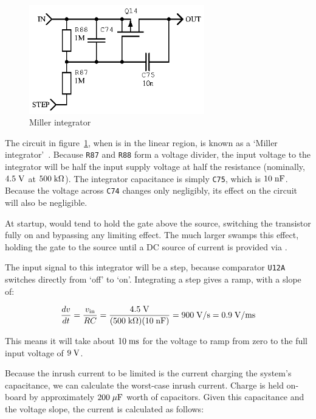 \begin{figure}[H]
\centering
\includegraphics[width=3in]{millerint}
\caption{Miller integrator}
\label{fig:miller}
\end{figure}

The circuit in figure~\ref{fig:miller}, when  is in the linear
region, is known as a `Miller integrator'~\cite[pg. 283]{tranckts-sawtooth}.
Because \texttt{R87} and \texttt{R88} form a voltage divider, the input
voltage to the integrator will be half the input supply voltage at half
the resistance (nominally, $4.5\;\mathrm{V}$ at $500\;\mathrm{k\Omega}$). The
integrator capacitance is simply \texttt{C75}, which is $10\;\mathrm{nF}$.
Because the voltage across \texttt{C74} changes only negligibly, its effect
on the circuit will also be negligible.

At startup,  would tend to hold the gate above the source,
switching the transistor fully on and bypassing any limiting effect. The
much larger  swamps this effect, holding the gate to the
source until a DC source of current is provided via .

The input signal to this integrator will be a step, because comparator
\texttt{U12A} switches directly from `off' to `on'. Integrating a step gives
a ramp, with a slope of:

\begin{equation*}
    \frac{dv}{dt} = \frac{v_{\mathrm{in}}}{RC} = \frac{4.5\;\mathrm{V}}{(500\;\mathrm{k\Omega})(10\;\mathrm{nF})}
    = 900\;\mathrm{V/s} = 0.9\;\mathrm{V/ms}
\end{equation*}

This means it will take about $10\;\mathrm{ms}$ for the voltage to ramp from zero
to the full input voltage of $9\;\mathrm{V}$.

Because the inrush current to be limited is the current charging the system's
capacitance, we can calculate the worst-case inrush current. Charge is held
on-board by approximately $200\;\mathrm{\mu F}$ worth of capacitors. Given this
capacitance and the voltage slope, the current is calculated as follows:

